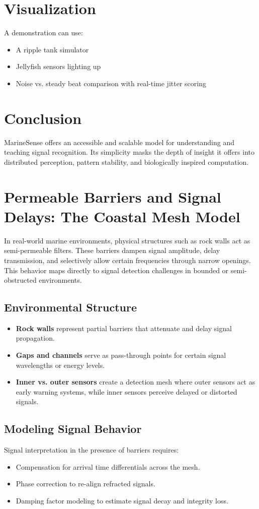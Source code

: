 \documentclass[11pt]{article}
\begin{document}
\section{Visualization}
A demonstration can use:
\begin{itemize}
  \item A ripple tank simulator
  \item Jellyfish sensors lighting up
  \item Noise vs. steady beat comparison with real-time jitter scoring
\end{itemize}

\section{Conclusion}
MarineSense offers an accessible and scalable model for understanding and teaching signal recognition. Its simplicity masks the depth of insight it offers into distributed perception, pattern stability, and biologically inspired computation.

\section{Permeable Barriers and Signal Delays: The Coastal Mesh Model}
In real-world marine environments, physical structures such as rock walls act as semi-permeable filters. These barriers dampen signal amplitude, delay transmission, and selectively allow certain frequencies through narrow openings. This behavior maps directly to signal detection challenges in bounded or semi-obstructed environments.

\subsection{Environmental Structure}
\begin{itemize}
  \item \textbf{Rock walls} represent partial barriers that attenuate and delay signal propagation.
  \item \textbf{Gaps and channels} serve as pass-through points for certain signal wavelengths or energy levels.
  \item \textbf{Inner vs. outer sensors} create a detection mesh where outer sensors act as early warning systems, while inner sensors perceive delayed or distorted signals.
\end{itemize}

\subsection{Modeling Signal Behavior}
Signal interpretation in the presence of barriers requires:
\begin{itemize}
  \item Compensation for arrival time differentials across the mesh.
  \item Phase correction to re-align refracted signals.
  \item Damping factor modeling to estimate signal decay and integrity loss.
\end{itemize}
\end{document}
